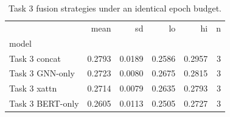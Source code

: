 \begin{table}[t]
\caption{Task 3 fusion strategies under an identical epoch budget.}
\label{tab:t3eq}
\begin{tabular}{lrrrrr}
\toprule
 & mean & sd & lo & hi & n \\
model &  &  &  &  &  \\
\midrule
Task 3 concat & 0.2793 & 0.0189 & 0.2586 & 0.2957 & 3 \\
Task 3 GNN-only & 0.2723 & 0.0080 & 0.2675 & 0.2815 & 3 \\
Task 3 xattn & 0.2714 & 0.0079 & 0.2635 & 0.2793 & 3 \\
Task 3 BERT-only & 0.2605 & 0.0113 & 0.2505 & 0.2727 & 3 \\
\bottomrule
\end{tabular}
\end{table}
